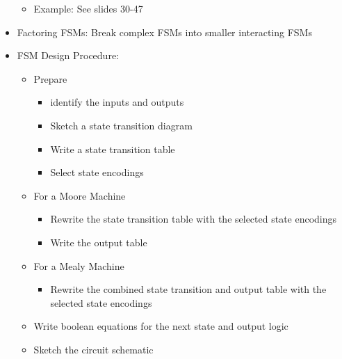 \documentclass[a4paper]{article}
\begin{document}
\begin{itemize}
		\begin{itemize}
		\item Example: See slides 30-47
		\end{itemize}
		\item Factoring FSMs: Break complex FSMs into smaller interacting FSMs
		\item FSM Design Procedure:
		\begin{itemize}
		\item Prepare
		\begin{itemize}
		\item identify the inputs and outputs
		\item Sketch a state transition diagram
		\item Write a state transition table
		\item Select state encodings
		\end{itemize}
		\item For a Moore Machine
		\begin{itemize}
		\item Rewrite the state transition table with the selected state encodings
		\item Write the output table
		\end{itemize}
		\item For a Mealy Machine
		\begin{itemize}
		\item Rewrite the combined state transition and output table with the selected state encodings
		\end{itemize}
		\item Write boolean equations for the next state and output logic
		\item Sketch the circuit schematic
		\end{itemize}
		\end{itemize}
		
\end{document}
